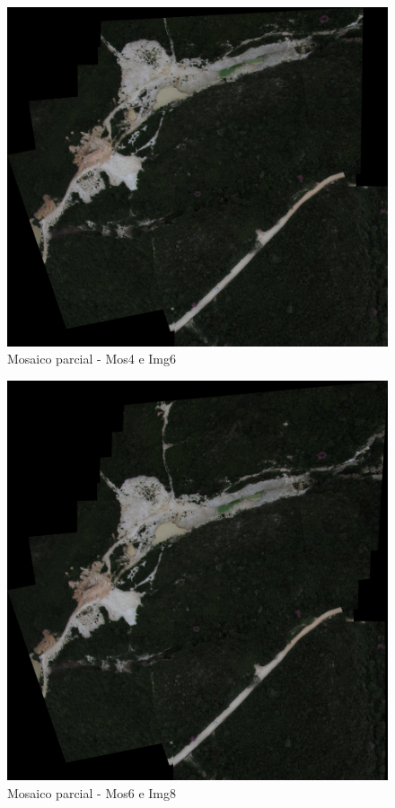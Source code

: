 \documentclass[9pt, a4paper, nofonttune, journal]{IEEEtran}
\begin{document}
\begin{figure}[!h]
\begin{center}
\includegraphics[scale=0.25]{figuras/Mosaic5}
\caption{Mosaico parcial - Mos4 e Img6}
\label{fig:mosaico}
\end{center}
\end{figure}



\begin{figure}[!h]
\begin{center}
\includegraphics[scale=0.25]{figuras/Mosaic7}
\caption{Mosaico parcial - Mos6 e Img8}
\label{fig:mosaico}
\end{center}
\end{figure}
\end{document}
